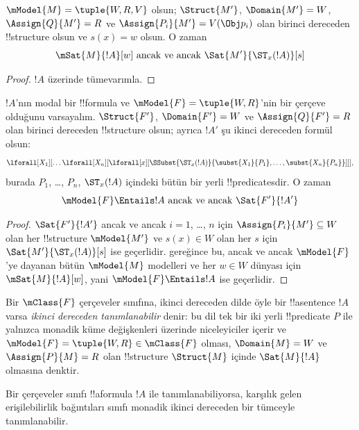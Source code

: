 \begin{prop}
  $\mModel{M}=\tuple{W,R,V}$ olsun; $\Struct{M'}$, $\Domain{M'}=W$,
  $\Assign{Q}{M'}=R$ ve $\Assign{P_i}{M'}=V(\Obj p_i)$ olan birinci
  dereceden !!{structure} olsun ve $s(x)=w$ olsun. O zaman
  \[
  \mSat{M}{!A}[w] \text{ ancak ve ancak } \Sat{M'}{\ST_x(!A)}[s]
  \]
\end{prop}

\begin{proof}
  $!A$ üzerinde tümevarımla.
\end{proof}

\begin{prop}
  $!A$'nın modal bir !!{formula} ve
  $\mModel{F}=\tuple{W,R}$'nin bir çerçeve olduğunu varsayalım.
  $\Struct{F'}$, $\Domain{F'}=W$ ve $\Assign{Q}{F'}=R$ olan birinci
  dereceden !!{structure} olsun; ayrıca $!A'$ şu ikinci dereceden formül
  olsun:
  \[
  \lforall[X_1][\dots\lforall[X_n][\lforall[x][
        \SSubst{\ST_x(!A)}{\subst{X_1}{P_1}, \dots,
          \subst{X_n}{P_n}}]]],
  \]
  burada $P_1$, \dots, $P_n$, $\ST_x(!A)$ içindeki bütün bir yerli
  !!{predicate}s{}dir. O zaman
  \[
  \mModel{F} \Entails !A \text{ ancak ve ancak } \Sat{F'}{!A'}
  \]
\end{prop}

\begin{proof}
  $\Sat{F'}{!A'}$ ancak ve ancak $i=1$, \dots, $n$ için
  $\Assign{P_i}{M'}\subseteq W$ olan her !!{structure} $\mModel{M'}$ ve
  $s(x)\in W$ olan her $s$ için $\Sat{M'}{\ST_x(!A)}[s]$ ise geçerlidir.
   gereğince bu, ancak ve ancak $\mModel{F}$'ye dayanan bütün
  $\mModel{M}$ modelleri ve her $w\in W$ dünyası için
  $\mSat{M}{!A}[w]$, yani $\mModel{F}\Entails !A$ ise geçerlidir.
\end{proof}

\begin{defn}
  Bir $\mClass{F}$ çerçeveler sınıfına, ikinci dereceden dilde öyle bir
  !!a{sentence} $!A$ varsa \emph{ikinci dereceden tanımlanabilir} denir:
  bu dil tek bir iki yerli !!{predicate} $P$ ile yalnızca monadik küme
  değişkenleri üzerinde niceleyiciler içerir ve
  $\mModel{F}=\tuple{W,R}\in\mClass{F}$ olması, $\Domain{M}=W$ ve
  $\Assign{P}{M}=R$ olan !!{structure} $\Struct{M}$ içinde
  $\Sat{M}{!A}$ olmasına denktir.
\end{defn}

\begin{cor}
  Bir çerçeveler sınıfı !!a{formula} $!A$ ile tanımlanabiliyorsa, karşılık
  gelen erişilebilirlik bağıntıları sınıfı monadik ikinci dereceden bir
  tümceyle tanımlanabilir.
\end{cor}

